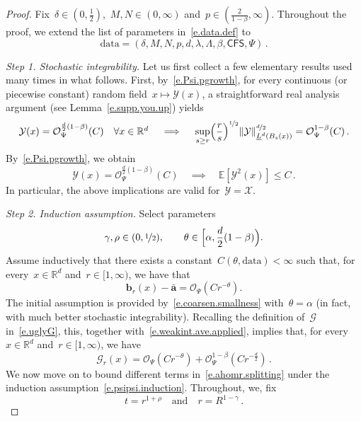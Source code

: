 \documentclass[11pt,twoside]{article} %
\numberwithin{equation}{section}
\theoremstyle{definition}
\let\originalleft\left
\let\originalright\right
\renewcommand{\left}{\mathopen{}\mathclose\bgroup\originalleft}
\renewcommand{\right}{\aftergroup\egroup\originalright}
\newcommand*{\R}{\ensuremath{\mathbb{R}}}
\renewcommand{\b}{\ensuremath{\mathbf{b}}}
\newcommand{\qand}{\quad \mbox{and} \quad }
\renewcommand{\a}{\mathbf{a}}
\newcommand{\ahom}{\bar{\a}}
\newcommand{\E}{\mathbb{E}}
\newcommand{\X}{\mathcal{X}}
\renewcommand{\O}{\mathcal{O}}
\newcommand{\Y}{\ensuremath{\mathcal{Y}}}
\newcommand{\data}{\mathrm{data}}
\newcommand{\CFS}{\mathsf{CFS}}
\begin{document}
\begin{proof}
Fix~$\delta \in (0,\frac12)$,~$M,N \in (0,\infty)$ and~$p \in (\frac{2}{1-\beta},\infty)$. Throughout the proof, we extend the list of parameters in~\eqref{e.data.def} to
\begin{equation*}  
\data = (\delta,M,N,p,d,\lambda,\Lambda,\beta,\CFS,\Psi)
\,.
\end{equation*} 

\emph{Step 1. Stochastic integrability.} 
Let us first collect a few elementary results used many times in what follows. First, by~\eqref{e.Psi.pgrowth}, for every continuous (or piecewise constant) random field~$x \mapsto \Y(x)$, a straightforward real analysis argument (see Lemma~\ref{e.supp.you.up}) yields
\begin{equation}  \label{e.weakint.ave.applied}
\mathcal{Y}(x) = \O_{\Psi}^{\frac d2(1-\beta)}(C) \quad
\mbox{$\forall x \in \R^d$}
\quad \implies \quad  
\sup_{s \geq r} \Bigl( \frac{r}{s}\Bigr)^{\nicefrac12}  \left\| \Y \right\|_{\underline{L}^d \left( B_{s}(x) \right)}^{\nicefrac d2}
=
\O_{\Psi}^{1-\beta}(C) \,.
\end{equation}
By~\eqref{e.Psi.pgrowth}, we obtain 
\begin{equation}  \label{e.weakint.ave.expectation}
\mathcal{Y}(x) = \O_{\Psi}^{\frac d2(1-\beta)}(C) 
\quad \implies \quad  
\E[ \Y^2(x)]  \leq C \,.
\end{equation}
In particular, the above implications are valid for~$\Y = \X$. 

\smallskip

\emph{Step 2. Induction assumption.} Select parameters 
\begin{equation}  \label{e.varthetaupper}
\gamma, \rho \in (0,\nicefrac12), \qquad \theta \in \Bigl[ \alpha , \frac{d}{2}(1-\beta) \Big) . 
\end{equation}
Assume inductively that there exists a constant~$C(\theta,\data)<\infty$ such that, for every~$x \in \R^d$ and~$r \in [1,\infty)$, we have that 
\begin{equation} \label{e.psipsi.induction}
\b_r(x) - \ahom  = \O_{\Psi} ( C r^{-\theta} ). 
\end{equation} 
The initial assumption is provided by~\eqref{e.coarsen.smallness} with~$\theta = \alpha$ (in fact, with much better stochastic integrability). Recalling the definition of~$\mathcal{G}$ in~\eqref{e.uglyG}, this, together with~\eqref{e.weakint.ave.applied}, implies that, for every~$x \in \R^d$ and~$r \in [1,\infty)$, we have
\begin{equation} \label{e.psipsi.uglyG}
\mathcal{G}_r(x) 
= 
\O_{\Psi} ( C r^{-\theta} )
+
\O_{\Psi}^{1-\beta   } ( C r^{-\frac{d}{2}} )
\,.
\end{equation}
We now move on to bound different terms in~\eqref{e.ahomr.splitting} under the induction assumption~\eqref{e.psipsi.induction}.  Throughout, we, fix
\begin{equation*}  
t = r^{1+\rho} 
\qand
r = R^{1-\gamma}
\,.
\end{equation*}







\end{proof}
\end{document}
